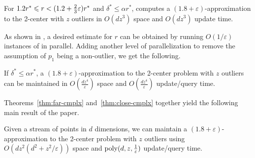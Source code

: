 \documentclass[envcountsame]{cls/cccg15}
\renewcommand{\O}{\ensuremath{{O}}}
\newcommand{\poly}{\mathop{\mathrm{poly}}}
\newcommand{\lee}{\leqslant}
\renewcommand{\leq}{\lee}
\renewcommand{\le}{\lee}
\newcommand{\eps}{\varepsilon}
\newcommand{\REM}[1]{}
\begin{document}
\begin{theorem} \label{thm:close}
	For $1.2r^* \le r < (1.2 + {2 \over 3}\eps)r^*$ and $\delta^* \le \alpha r^*$,
	 computes a $(1.8+\eps)$-approximation to 
	the 2-center with $z$ outliers 
	in $\O (dz^3)$ space and $\O (dz^3)$ update time.
\end{theorem}

\REM{
\begin{proof}
Since our algorithm considers all possible input cases of streaming points, there is at least one feasible solution. Since every feasible solution has its larger radius at most $3r/2$, the final solution has larger radius at most $3r/2 \le (1.8 + \eps)r^*$.
For space complexity, our algorithm maintains at most two balls in each case, and therefore it uses $\O(dz^3)$ space. Whenever the next point is inserted, the algorithm updates the solution for each subcase in $\O (d)$ time. Therefore, the algorithm spends $\O (dz^3)$ update time for each point of $P$. Answering a query consists of choosing the minimum radius among all the candidate solutions, which amounts to $\O (dz^3)$ time.
\end{proof}
}


\noindent
As shown in , a desired estimate for $r$ can be
obtained by running $O(1/\eps)$ instances of  in parallel.
Adding another level of parallelization to remove the assumption of $p_1$
being a non-outlier, we get the following.

\begin{theorem}
\label{thm:close-cmplx}
	If $\delta^* \leq \alpha r^*$, a $(1.8 + \eps)$-approximation to the 2-center problem with $z$ outliers 
	can be maintained in $\O(\frac{dz^4}{\eps})$ space 
	and $\O(\frac{dz^4}{\eps})$ update/query time.
\end{theorem}


\noindent
Theorems~\ref{thm:far-cmplx} and~\ref{thm:close-cmplx}
together yield the following main result of the paper.

\begin{theorem} \label{thm:1-center-stream}
	Given a stream of points in $d$ dimensions,
	we can maintain a $(1.8 + \eps)$-approximation to 
	the 2-center problem with $z$ outliers using 
	$\O(dz^2 (d^2 + z^2/\eps))$ space and 
	$\poly(d, z, {1 \over \eps})$ update/query time.
\end{theorem}
\end{document}
